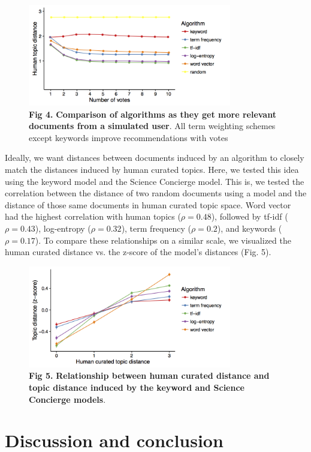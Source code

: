 \documentclass[a4paper]{article}
\begin{document}
\begin{figure}[!ht]
\centering
\includegraphics[width=3.5in]{performance_vs_votes}
\caption*{\textbf{Fig 4.} \textbf{Comparison of algorithms as they get more relevant documents from a simulated user}. All term weighting schemes except keywords
improve recommendations with votes}
\end{figure}

Ideally, we want distances between documents induced by an algorithm to closely match the distances induced by human curated topics. Here, we tested this idea using the keyword model and the Science Concierge model. This is, we tested the correlation between the distance of two random documents using a model and the distance of those same documents in human curated topic space.  Word vector had the highest correlation with human topics ($\rho = 0.48$), followed by tf-idf ($\rho = 0.43$), log-entropy ($\rho = 0.32$), term frequency ($\rho = 0.2$),
and keywords ($\rho = 0.17$). To compare these relationships on a similar scale, we visualized the human curated distance vs. the z-score of the model’s distances (Fig. 5).


\begin{figure}[!ht]
\centering
\includegraphics[width=3.5in]{human_vs_topic_distance}
\caption*{\textbf{Fig 5.} \textbf{Relationship between human curated distance and topic distance induced by the keyword and Science Concierge models}.
}
\end{figure}


\section{Discussion and conclusion}
\end{document}
